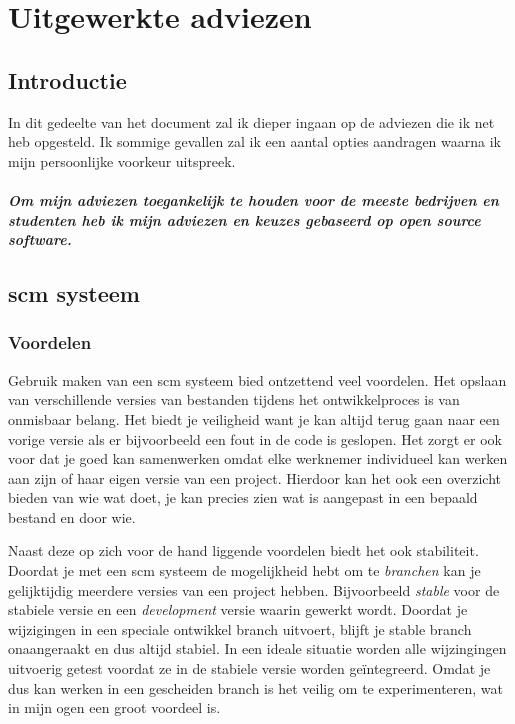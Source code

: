 \chapter{Uitgewerkte adviezen}

\section{Introductie}

In dit gedeelte van het document zal ik dieper ingaan op de adviezen die ik net heb opgesteld. Ik sommige gevallen zal ik een aantal opties aandragen waarna ik mijn persoonlijke voorkeur uitspreek.

\paragraph{Om mijn adviezen toegankelijk te houden voor de meeste bedrijven en studenten heb ik mijn adviezen en keuzes gebaseerd op open source software.}

\section{{\sc scm} systeem}

\subsection{Voordelen}

Gebruik maken van een {\sc scm} systeem bied ontzettend veel voordelen. Het opslaan van verschillende versies van bestanden tijdens het ontwikkelproces is van onmisbaar belang. Het biedt je veiligheid want je kan altijd terug gaan naar een vorige versie als er bijvoorbeeld een fout in de code is geslopen. Het zorgt er ook voor dat je goed kan samenwerken omdat elke werknemer individueel kan werken aan zijn of haar eigen versie van een project. Hierdoor kan het ook een overzicht bieden van wie wat doet, je kan precies zien wat is aangepast in een bepaald bestand en door wie.

Naast deze op zich voor de hand liggende voordelen biedt het ook stabiliteit. Doordat je met een {\sc scm} systeem de mogelijkheid hebt om te \emph{branchen} kan je gelijktijdig meerdere versies van een project hebben. Bijvoorbeeld \emph{stable} voor de stabiele versie en een \emph{development} versie waarin gewerkt wordt. Doordat je wijzigingen in een speciale ontwikkel branch uitvoert, blijft je stable branch onaangeraakt en dus altijd stabiel. In een ideale situatie worden alle wijzingingen uitvoerig getest voordat ze in de stabiele versie worden ge\"{i}ntegreerd. Omdat je dus kan werken in een gescheiden branch is het veilig om te experimenteren, wat in mijn ogen een groot voordeel is.

